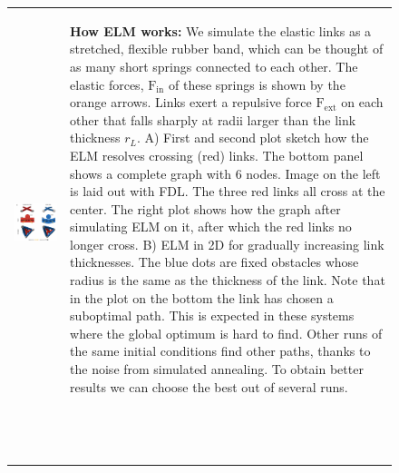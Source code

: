 \documentclass[nofootinbib,preprint,floatfix,titlepage,endfloats]{revtex4} %
\begin{document}
{\begin{figure}
\begin{tabular}{ll}
         \begin{minipage}{.7\columnwidth}
    \includegraphics[width = \columnwidth]{fig-09-19/elf-resolve.png}
    \end{minipage}
         & 
         \begin{minipage}{.3\columnwidth}
         \raggedright
         \begin{spacing}{.5}
         {\scriptsize{\bf How ELM works:} We simulate the elastic links as a stretched, flexible rubber band, which can be thought of as many short springs connected to each other. The elastic forces, $\mathrm{F}_{\mathrm{in}}$ of these springs is shown by the orange arrows. Links exert a repulsive force $\mathrm{F}_{\mathrm{ext}}$  on each other that falls sharply at radii larger than the link thickness $r_L$. A) First and second plot sketch how the ELM resolves crossing (red) links. The bottom panel shows a complete graph with 6 nodes. Image on the left is laid out with FDL. The three red links all cross at the center. The right plot shows how the graph after simulating ELM on it, after which the red links no longer cross. B) ELM in 2D for gradually increasing link thicknesses. The blue dots are fixed obstacles whose radius is the same as the thickness of the link. Note that in the plot on the bottom the link has chosen a suboptimal path. This is  expected in these systems where the global optimum is hard to find. Other runs of the same initial conditions find other paths, thanks to the noise from simulated annealing. To obtain better results we can choose the best out of several runs.}
         
        \end{spacing}
    \end{minipage}
    ~\\~\bigskip
    \end{tabular}
    \label{fig:crossings}
\end{figure}
} %
\end{document}
